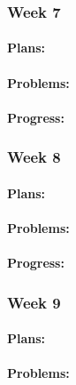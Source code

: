 \documentclass[onecolumn, draftclsnofoot,10pt, compsoc]{article}
\begin{document}
		\subsubsection{Week 7}
		
		    \paragraph{Plans:} \hfill \break
		
		    \paragraph{Problems:} \hfill \break
		
		    \paragraph{Progress:} \hfill \break
		
		\subsubsection{Week 8}
		
			\paragraph{Plans:} \hfill \break
		
		    \paragraph{Problems:} \hfill \break
		
		    \paragraph{Progress:} \hfill \break
		
		\subsubsection{Week 9}
		
			\paragraph{Plans:} \hfill \break
		
		    \paragraph{Problems:} \hfill \break
		
\end{document}
